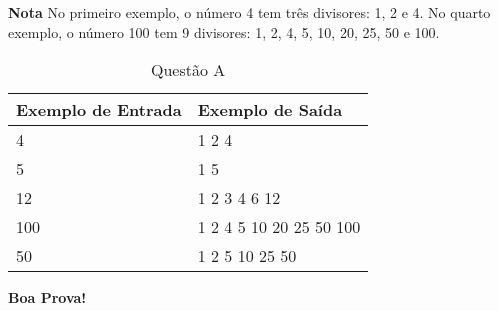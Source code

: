 \documentclass[a4paper, 12pt]{article}
\begin{document}
\newline \newline
\textbf{{\large Nota}} \newline
No primeiro exemplo, o número 4 tem três divisores: 1, 2 e 4. \newline
No quarto exemplo, o número 100 tem 9 divisores: 1, 2, 4, 5, 10, 20, 25, 50 e 100.
\newline
\begin{table}[H]
\centering
\begin{tabular}{|l|l|}
\hline
\textbf{Exemplo de Entrada} & \textbf{Exemplo de Saída} \\ \hline
4                           & 1 2 4                     \\ \hline
5                           & 1 5                       \\ \hline
12                          & 1 2 3 4 6 12              \\ \hline
100                         & 1 2 4 5 10 20 25 50 100   \\ \hline
50                          & 1 2 5 10 25 50            \\ \hline
\end{tabular}
\caption{Questão A}
\end{table}
\flushright
\textbf{\Large Boa Prova!}
\end{document}
